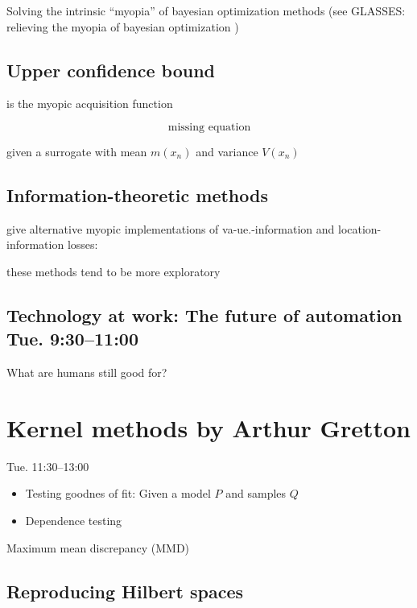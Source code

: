 \documentclass[b5paper]{report}
\begin{document}
Solving the intrinsic ``myopia'' of bayesian optimization methods (see GLASSES:
relieving the myopia of bayesian optimization \cite{gonzalez2016glasses})


\section{Upper confidence bound}

is the myopic acquisition function


\begin{equation}
  \text{missing equation}
\end{equation}

given a surrogate with mean $m(x_n)$ and variance $V(x_n)$


\section{Information-theoretic methods}

give alternative myopic implementations of va-ue.-information and
location-information losses:


these methods tend to be more exploratory

\section{Technology at work: The future of automation Tue. 9:30--11:00}


What are humans still good for?


\chapter{Kernel methods by Arthur Gretton}

 Tue. 11:30--13:00

\begin{itemize}
  \item Testing goodnes of fit: Given a model $P$ and samples $Q$
  \item Dependence testing
\end{itemize}

Maximum mean discrepancy (MMD)

\section{Reproducing Hilbert spaces}
\end{document}
